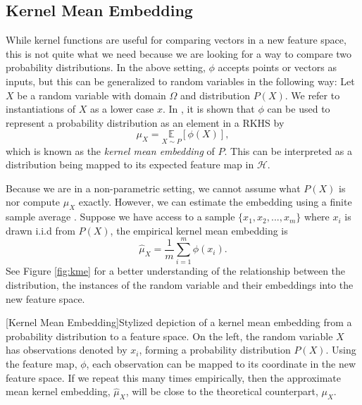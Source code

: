 \subsection{Kernel Mean Embedding}
\label{kernel_mean_emb}
While kernel functions are useful for comparing vectors in a new feature space, this is not quite what we need because we are looking for a way to compare two probability distributions. In the above setting, $\phi$ accepts points or vectors as inputs, but this can be generalized to random variables in the following way: Let $X$ be a random variable with domain $\Omega$ and distribution $P(X)$. We refer to instantiations of $X$ as a lower case $x$. In \cite{smola2007hilbert}, it is shown that $\phi$ can be used to represent a probability distribution as an element in a RKHS by
\begin{equation}
\mu_X =\underset{X \sim P} {\mathbb{E}}[\phi(X)],
\end{equation}
which is known as the \textit{kernel mean embedding} of $P$. This can be interpreted as a  distribution being mapped to its expected feature map in $\mathcal{H}$. 

Because we are in a non-parametric setting, we cannot assume what $P(X)$ is nor compute $\mu_X$ exactly. However, we can estimate the embedding using a finite sample average  \cite{smola2007hilbert}. Suppose we have access to a sample $\{x_1, x_2, ..., x_m\}$ where $x_i$ is drawn i.i.d from $P(X)$, the empirical kernel mean embedding is 
\begin{equation}
\hat{\mu}_X = \frac{1}{m} \sum_{i=1}^m \phi(x_i).
\end{equation}
See Figure \ref{fig:kme} for a better understanding of the relationship between the distribution, the instances of the random variable and their embeddings into the new feature space.

\begin{center} 
[Kernel Mean Embedding]{Stylized depiction of a kernel mean embedding from a probability distribution to a feature space. On the left, the random variable $X$ has observations denoted by $x_i$, forming a probability distribution $P(X)$.  Using the feature map, $\phi$, each observation can be mapped to its coordinate in the new feature space.  If we repeat this many times empirically, then the approximate mean kernel embedding, $\hat{\mu}_X$, will be close to the theoretical counterpart, $\mu_X$.} 
\label{fig:kme} 
\end{center}


